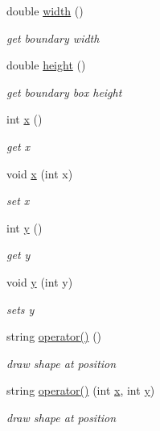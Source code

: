 \begin{DoxyCompactItemize}
double \hyperlink{class_shape_ab00e62f9f7cd0be450ac29437b80ce13}{width} ()
\begin{DoxyCompactList}\small\item\em get boundary width \end{DoxyCompactList}\item 
double \hyperlink{class_shape_a11686d7b1511fc6707f4dd7b74c65111}{height} ()
\begin{DoxyCompactList}\small\item\em get boundary box height \end{DoxyCompactList}\item 
int \hyperlink{class_shape_a41e403e73d2949f1a6adfba6032c41ec}{x} ()
\begin{DoxyCompactList}\small\item\em get x \end{DoxyCompactList}\item 
void \hyperlink{class_shape_adc67c1bfb923ed3d7e0cfe4a0cd34f29}{x} (int x)
\begin{DoxyCompactList}\small\item\em set x \end{DoxyCompactList}\item 
int \hyperlink{class_shape_ac757f715cc5b5681f2c691663ac06f0a}{y} ()
\begin{DoxyCompactList}\small\item\em get y \end{DoxyCompactList}\item 
void \hyperlink{class_shape_ae3245e558aad6f812b108632aed6745f}{y} (int y)
\begin{DoxyCompactList}\small\item\em sets y \end{DoxyCompactList}\item 
string \hyperlink{class_shape_ac3ac785096912e7b1b3c0ac603714482}{operator()} ()
\begin{DoxyCompactList}\small\item\em draw shape at position \end{DoxyCompactList}\item 
string \hyperlink{class_shape_ab188d62cc440aeaab8407b32caaa8823}{operator()} (int \hyperlink{class_shape_a41e403e73d2949f1a6adfba6032c41ec}{x}, int \hyperlink{class_shape_ac757f715cc5b5681f2c691663ac06f0a}{y})
\begin{DoxyCompactList}\small\item\em draw shape at position \end{DoxyCompactList}\item 

\end{DoxyCompactItemize}
